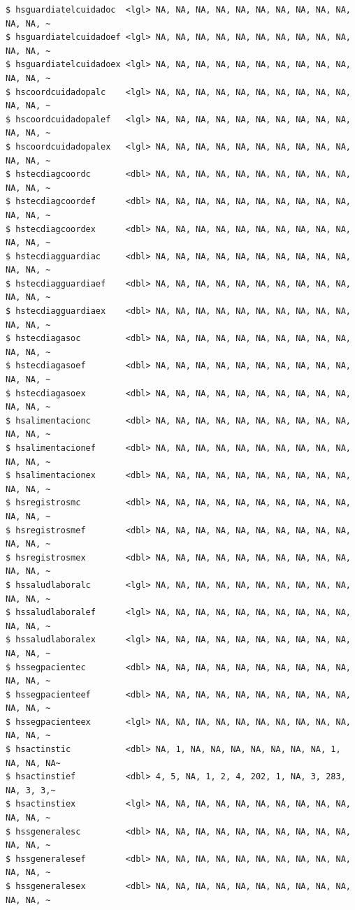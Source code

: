 \documentclass[
  letterpaper,
  DIV=11,
  numbers=noendperiod]{scrreprt}
\begin{document}
\begin{verbatim}
$ hsguardiatelcuidadoc  <lgl> NA, NA, NA, NA, NA, NA, NA, NA, NA, NA, NA, NA, ~
$ hsguardiatelcuidadoef <lgl> NA, NA, NA, NA, NA, NA, NA, NA, NA, NA, NA, NA, ~
$ hsguardiatelcuidadoex <lgl> NA, NA, NA, NA, NA, NA, NA, NA, NA, NA, NA, NA, ~
$ hscoordcuidadopalc    <lgl> NA, NA, NA, NA, NA, NA, NA, NA, NA, NA, NA, NA, ~
$ hscoordcuidadopalef   <lgl> NA, NA, NA, NA, NA, NA, NA, NA, NA, NA, NA, NA, ~
$ hscoordcuidadopalex   <lgl> NA, NA, NA, NA, NA, NA, NA, NA, NA, NA, NA, NA, ~
$ hstecdiagcoordc       <dbl> NA, NA, NA, NA, NA, NA, NA, NA, NA, NA, NA, NA, ~
$ hstecdiagcoordef      <dbl> NA, NA, NA, NA, NA, NA, NA, NA, NA, NA, NA, NA, ~
$ hstecdiagcoordex      <dbl> NA, NA, NA, NA, NA, NA, NA, NA, NA, NA, NA, NA, ~
$ hstecdiagguardiac     <dbl> NA, NA, NA, NA, NA, NA, NA, NA, NA, NA, NA, NA, ~
$ hstecdiagguardiaef    <dbl> NA, NA, NA, NA, NA, NA, NA, NA, NA, NA, NA, NA, ~
$ hstecdiagguardiaex    <dbl> NA, NA, NA, NA, NA, NA, NA, NA, NA, NA, NA, NA, ~
$ hstecdiagasoc         <dbl> NA, NA, NA, NA, NA, NA, NA, NA, NA, NA, NA, NA, ~
$ hstecdiagasoef        <dbl> NA, NA, NA, NA, NA, NA, NA, NA, NA, NA, NA, NA, ~
$ hstecdiagasoex        <dbl> NA, NA, NA, NA, NA, NA, NA, NA, NA, NA, NA, NA, ~
$ hsalimentacionc       <dbl> NA, NA, NA, NA, NA, NA, NA, NA, NA, NA, NA, NA, ~
$ hsalimentacionef      <dbl> NA, NA, NA, NA, NA, NA, NA, NA, NA, NA, NA, NA, ~
$ hsalimentacionex      <dbl> NA, NA, NA, NA, NA, NA, NA, NA, NA, NA, NA, NA, ~
$ hsregistrosmc         <dbl> NA, NA, NA, NA, NA, NA, NA, NA, NA, NA, NA, NA, ~
$ hsregistrosmef        <dbl> NA, NA, NA, NA, NA, NA, NA, NA, NA, NA, NA, NA, ~
$ hsregistrosmex        <dbl> NA, NA, NA, NA, NA, NA, NA, NA, NA, NA, NA, NA, ~
$ hssaludlaboralc       <lgl> NA, NA, NA, NA, NA, NA, NA, NA, NA, NA, NA, NA, ~
$ hssaludlaboralef      <lgl> NA, NA, NA, NA, NA, NA, NA, NA, NA, NA, NA, NA, ~
$ hssaludlaboralex      <lgl> NA, NA, NA, NA, NA, NA, NA, NA, NA, NA, NA, NA, ~
$ hssegpacientec        <dbl> NA, NA, NA, NA, NA, NA, NA, NA, NA, NA, NA, NA, ~
$ hssegpacienteef       <dbl> NA, NA, NA, NA, NA, NA, NA, NA, NA, NA, NA, NA, ~
$ hssegpacienteex       <lgl> NA, NA, NA, NA, NA, NA, NA, NA, NA, NA, NA, NA, ~
$ hsactinstic           <dbl> NA, 1, NA, NA, NA, NA, NA, NA, NA, 1, NA, NA, NA~
$ hsactinstief          <dbl> 4, 5, NA, 1, 2, 4, 202, 1, NA, 3, 283, NA, 3, 3,~
$ hsactinstiex          <lgl> NA, NA, NA, NA, NA, NA, NA, NA, NA, NA, NA, NA, ~
$ hssgeneralesc         <dbl> NA, NA, NA, NA, NA, NA, NA, NA, NA, NA, NA, NA, ~
$ hssgeneralesef        <dbl> NA, NA, NA, NA, NA, NA, NA, NA, NA, NA, NA, NA, ~
$ hssgeneralesex        <dbl> NA, NA, NA, NA, NA, NA, NA, NA, NA, NA, NA, NA, ~

\end{verbatim}
\end{document}
